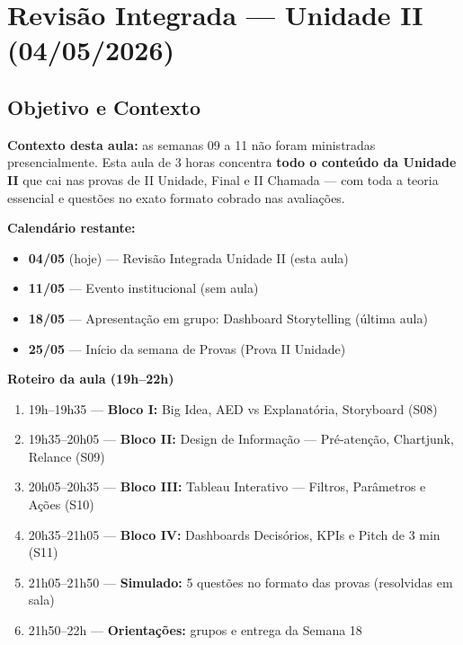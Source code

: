 
\chapter{Revisão Integrada — Unidade II (04/05/2026)}

\section{Objetivo e Contexto}

\begin{NoteBox}
\textbf{Contexto desta aula:} as semanas 09 a 11 não foram ministradas presencialmente.
Esta aula de 3 horas concentra \textbf{todo o conteúdo da Unidade II} que cai nas provas
de II Unidade, Final e II Chamada — com toda a teoria essencial e questões no exato
formato cobrado nas avaliações.

\textbf{Calendário restante:}
\begin{itemize}
  \item \textbf{04/05} (hoje) — Revisão Integrada Unidade II (esta aula)
  \item \textbf{11/05} — Evento institucional (sem aula)
  \item \textbf{18/05} — Apresentação em grupo: Dashboard Storytelling (última aula)
  \item \textbf{25/05} — Início da semana de Provas (Prova II Unidade)
\end{itemize}
\end{NoteBox}

\begin{BoardBox}
\textbf{Roteiro da aula (19h–22h)}
\begin{enumerate}
  \item 19h–19h35 — \textbf{Bloco I:} Big Idea, AED vs Explanatória, Storyboard (S08)
  \item 19h35–20h05 — \textbf{Bloco II:} Design de Informação — Pré-atenção, Chartjunk, Relance (S09)
  \item 20h05–20h35 — \textbf{Bloco III:} Tableau Interativo — Filtros, Parâmetros e Ações (S10)
  \item 20h35–21h05 — \textbf{Bloco IV:} Dashboards Decisórios, KPIs e Pitch de 3 min (S11)
  \item 21h05–21h50 — \textbf{Simulado:} 5 questões no formato das provas (resolvidas em sala)
  \item 21h50–22h — \textbf{Orientações:} grupos e entrega da Semana 18
\end{enumerate}
\end{BoardBox}

